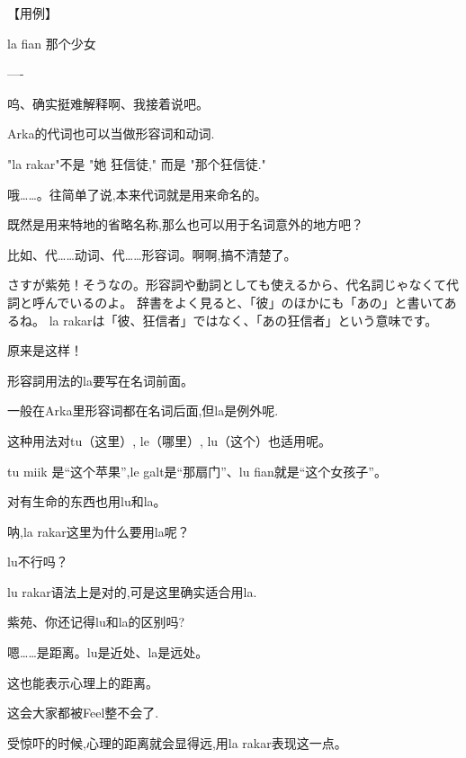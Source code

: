 【用例】

la fian 那个少女

----

呜、确实挺难解释啊、我接着说吧。

Arka的代词也可以当做形容词和动词.

"la rakar"不是 "她 狂信徒," 而是 "那个狂信徒."


哦……。往简单了说,本来代词就是用来命名的。

既然是用来特地的省略名称,那么也可以用于名词意外的地方吧？

比如、代……动词、代……形容词。啊啊,搞不清楚了。


さすが紫苑！そうなの。形容詞や動詞としても使えるから、代名詞じゃなくて代詞と呼んでいるのよ。
辞書をよく見ると、「彼」のほかにも「あの」と書いてあるね。
la rakarは「彼、狂信者」ではなく、「あの狂信者」という意味です。
\begin{center}
    \noindent{}
\end{center}




原来是这样！

形容詞用法的la要写在名词前面。

一般在Arka里形容词都在名词后面,但la是例外呢.

这种用法对tu（这里）, le（哪里）, lu（这个）也适用呢。

tu miik 是``这个苹果'',le galt是``那扇门''、lu fian就是``这个女孩子''。

对有生命的东西也用lu和la。



呐,la rakar这里为什么要用la呢？

lu不行吗？


lu rakar语法上是对的,可是这里确实适合用la.

紫苑、你还记得lu和la的区别吗?


嗯……是距离。lu是近处、la是远处。


这也能表示心理上的距离。

这会大家都被Feel整不会了.

受惊吓的时候,心理的距离就会显得远,用la rakar表现这一点。


